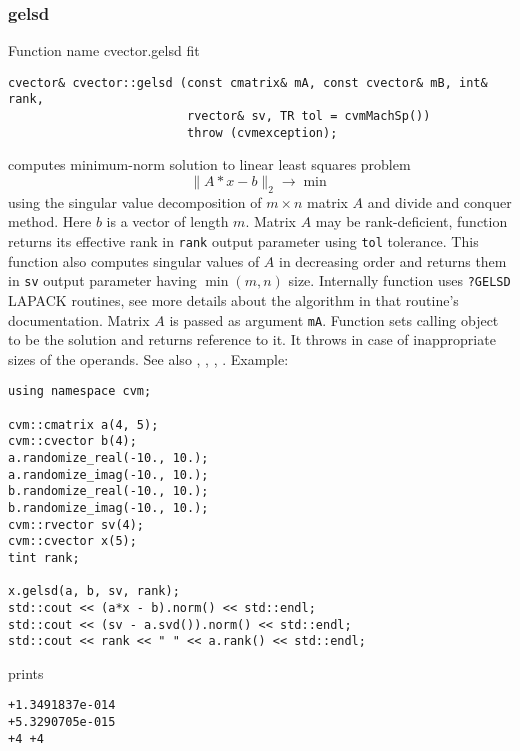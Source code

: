 \subsubsection{gelsd}
Function%
\pdfdest name {cvector.gelsd} fit
\begin{verbatim}
cvector& cvector::gelsd (const cmatrix& mA, const cvector& mB, int& rank,
                         rvector& sv, TR tol = cvmMachSp())
                         throw (cvmexception);
\end{verbatim}
computes  minimum-norm solution to  linear
least squares problem 
\begin{equation*}
\|A*x-b\|_2\to\min
\end{equation*}
using the singular value decomposition of $m\times n$ matrix $A$
and  divide and conquer method.
Here $b$ is a vector of length $m$.
Matrix $A$ may be rank-deficient, function returns its effective rank in \verb"rank"
output parameter using \verb"tol" tolerance.
This function also computes
singular values of $A$ in decreasing order and returns them in \verb"sv" output parameter
having $\min(m,n)$ size.
Internally  function uses \verb"?GELSD" LAPACK routines, see more details
about the algorithm in that routine's documentation.
Matrix $A$ is passed as  argument \verb"mA".
Function sets calling object to be the solution and returns reference to it.
It throws
in case of inappropriate sizes of the operands.
See also , 
, , 
.
Example:
\begin{Verbatim}
using namespace cvm;

cvm::cmatrix a(4, 5);
cvm::cvector b(4);
a.randomize_real(-10., 10.);
a.randomize_imag(-10., 10.);
b.randomize_real(-10., 10.);
b.randomize_imag(-10., 10.);
cvm::rvector sv(4);
cvm::cvector x(5);
tint rank;

x.gelsd(a, b, sv, rank);
std::cout << (a*x - b).norm() << std::endl;
std::cout << (sv - a.svd()).norm() << std::endl;
std::cout << rank << " " << a.rank() << std::endl;
\end{Verbatim}
prints
\begin{Verbatim}
+1.3491837e-014
+5.3290705e-015
+4 +4
\end{Verbatim}
\newpage






